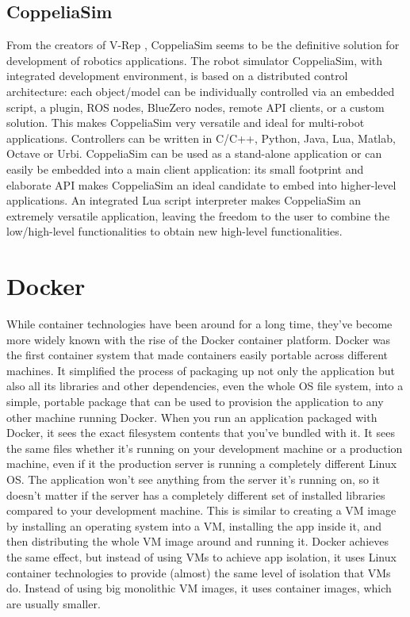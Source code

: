
\subsection{CoppeliaSim}
From the creators of V-Rep \cite{VREP}, CoppeliaSim \cite{coppeliaSim} seems to be the definitive solution for development of robotics applications.
The robot simulator CoppeliaSim, with integrated development environment, is based on a distributed control architecture: each object/model can be individually controlled via an embedded script, a plugin, ROS nodes, BlueZero nodes, remote API clients, or a custom solution. This makes CoppeliaSim very versatile and ideal for multi-robot applications. Controllers can be written in C/C++, Python, Java, Lua, Matlab, Octave or Urbi.
CoppeliaSim can be used as a stand-alone application or can easily be embedded into a main client application: its small footprint and elaborate API makes CoppeliaSim an ideal candidate to embed into higher-level applications. An integrated Lua script interpreter makes CoppeliaSim an extremely versatile application, leaving the freedom to the user to combine the low/high-level functionalities to obtain new high-level functionalities.




\section{Docker} %
While container technologies have been around for a long time, they’ve become more widely known with the rise of the Docker container platform. Docker was the first container system that made containers easily portable across different machines. It simplified the process of packaging up not only the application but also all its libraries and other dependencies, even the whole OS file system, into a simple, portable package that can be used to provision the application to any other machine running Docker. When you run an application packaged with Docker, it sees the exact filesystem contents that you’ve bundled with it. It sees the same files whether it’s running on your development machine or a production machine, even if it the production server is running a completely different Linux OS. The application won’t see anything from the server it’s running on, so it doesn’t matter if the server has a completely different set of installed libraries compared to your development machine.
This is similar to creating a VM image by installing an operating system into a VM, installing the app inside it, and then distributing the whole VM image around and running it. Docker achieves the same effect, but instead of using VMs to achieve app isolation, it uses Linux container technologies to provide (almost) the same level of isolation that VMs do. Instead of using big monolithic VM images, it uses container images, which are usually smaller.

